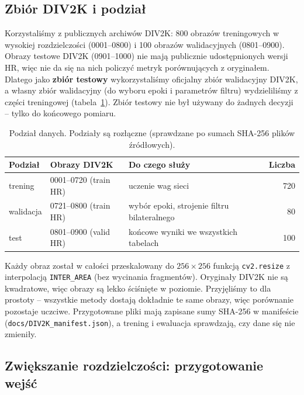 \documentclass[11pt,a4paper]{article}
\newcommand{\code}[1]{\texttt{\mdseries #1}}
\begin{document}
\subsection{Zbiór DIV2K i podział}

Korzystaliśmy z publicznych archiwów DIV2K: 800 obrazów treningowych w wysokiej
rozdzielczości (0001--0800) i 100 obrazów walidacyjnych (0801--0900). Obrazy testowe DIV2K
(0901--1000) nie mają publicznie udostępnionych wersji HR, więc nie da się na nich policzyć metryk
porównujących z oryginałem. Dlatego jako \textbf{zbiór testowy} wykorzystaliśmy oficjalny zbiór
walidacyjny DIV2K, a własny zbiór walidacyjny (do wyboru epoki i parametrów filtru) wydzieliliśmy
z części treningowej (tabela~\ref{tab:podzial}). Zbiór testowy nie był używany do żadnych decyzji
-- tylko do końcowego pomiaru.

\begin{table}[H]
  \centering\small
  \caption{Podział danych. Podziały są rozłączne (sprawdzane po sumach SHA-256 plików źródłowych).}
  \label{tab:podzial}
  \begin{tabular}{@{}lllr@{}}
    \toprule
    Podział & Obrazy DIV2K & Do czego służy & Liczba \\
    \midrule
    trening   & 0001--0720 (train HR) & uczenie wag sieci & 720 \\
    walidacja & 0721--0800 (train HR) & wybór epoki, strojenie filtru bilateralnego & 80 \\
    test      & 0801--0900 (valid HR) & końcowe wyniki we wszystkich tabelach & 100 \\
    \bottomrule
  \end{tabular}
\end{table}

Każdy obraz został w całości przeskalowany do $256\times256$ funkcją \code{cv2.resize} z interpolacją
\code{INTER\_AREA} (bez wycinania fragmentów). Oryginały DIV2K nie są kwadratowe, więc obrazy są
lekko ściśnięte w poziomie. Przyjęliśmy to dla prostoty -- wszystkie metody dostają dokładnie te same
obrazy, więc porównanie pozostaje uczciwe. Przygotowane pliki mają zapisane sumy SHA-256 w manifeście
(\code{docs/DIV2K\_manifest.json}), a trening i ewaluacja sprawdzają, czy dane się nie zmieniły.

\subsection{Zwiększanie rozdzielczości: przygotowanie wejść}\label{sec:sr-dane}
\end{document}
